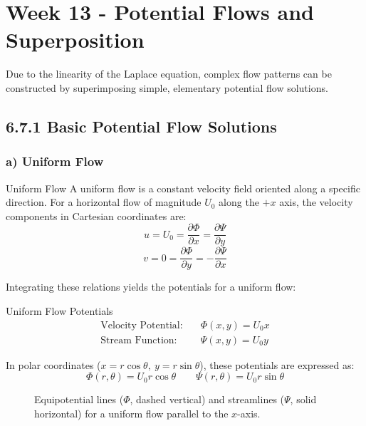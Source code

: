 \section{Week 13 - Potential Flows and Superposition}

Due to the linearity of the Laplace equation, complex flow patterns can be constructed by superimposing simple, elementary potential flow solutions.

\subsection{6.7.1 Basic Potential Flow Solutions}
\subsubsection{a) Uniform Flow}

\begin{defbox}{Uniform Flow}
A uniform flow is a constant velocity field oriented along a specific direction. For a horizontal flow of magnitude $U_0$ along the $+x$ axis, the velocity components in Cartesian coordinates are:
$$u = U_0 = \frac{\partial \Phi}{\partial x} = \frac{\partial \Psi}{\partial y}$$
$$v = 0 = \frac{\partial \Phi}{\partial y} = -\frac{\partial \Psi}{\partial x}$$
\end{defbox}

Integrating these relations yields the potentials for a uniform flow:
\begin{eqbox}{Uniform Flow Potentials}
\begin{align*}
\text{Velocity Potential:} \quad & \Phi(x, y) = U_0 x \\
\text{Stream Function:} \quad & \Psi(x, y) = U_0 y
\end{align*}
\end{eqbox}

In polar coordinates ($x = r\cos\theta,\ y = r\sin\theta$), these potentials are expressed as:
$$\Phi(r, \theta) = U_0 r \cos\theta \qquad \Psi(r, \theta) = U_0 r \sin\theta$$

\begin{figure}[htbp]
\centering
{}
\caption{Equipotential lines ($\Phi$, dashed vertical) and streamlines ($\Psi$, solid horizontal) for a uniform flow parallel to the $x$-axis.}
\label{fig:uniform_flow}
\end{figure}

